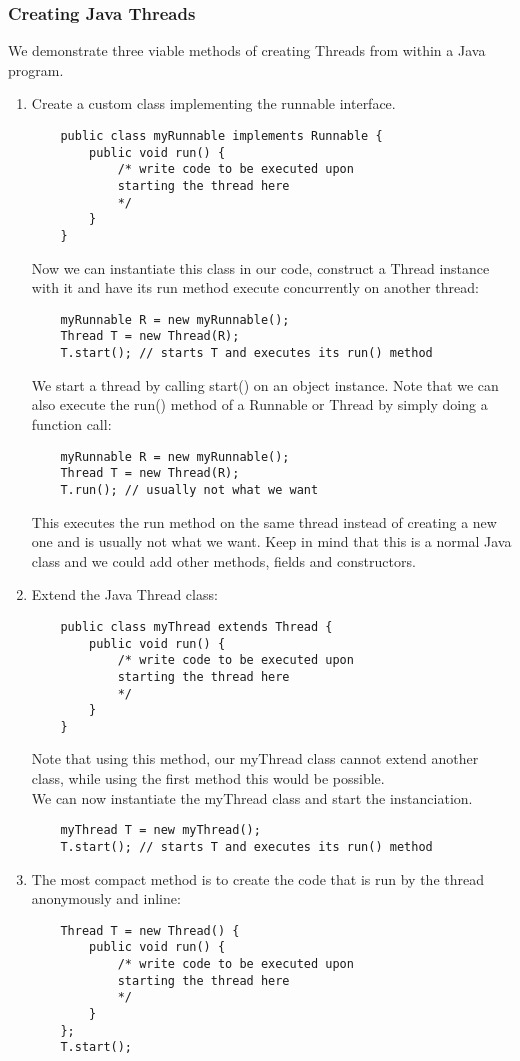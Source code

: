 \documentclass[main]{subfiles}
\begin{document}
\subsubsection{Creating Java Threads}
We demonstrate three viable methods of creating Threads from within a Java program.
\begin{enumerate}
    \item Create a custom class implementing the runnable interface.
    \begin{verbatim}
    public class myRunnable implements Runnable {
        public void run() {
            /* write code to be executed upon
            starting the thread here
            */
        }
    }
    \end{verbatim}
    Now we can instantiate this class in our code, construct a Thread instance with it and have its run method execute concurrently on another thread:
    \begin{verbatim}
    myRunnable R = new myRunnable();
    Thread T = new Thread(R);
    T.start(); // starts T and executes its run() method
    \end{verbatim}
    We start a thread by calling start() on an object instance. Note that we can also execute the run() method of a Runnable or Thread by simply doing a function call:
    \begin{verbatim}
    myRunnable R = new myRunnable();
    Thread T = new Thread(R);
    T.run(); // usually not what we want
    \end{verbatim}
    This executes the run method on the same thread instead of creating a new one and is usually not what we want.
    Keep in mind that this is a normal Java class and we could add other methods, fields and constructors.

    \item Extend the Java Thread class:
    \begin{verbatim}
    public class myThread extends Thread {
        public void run() {
            /* write code to be executed upon
            starting the thread here
            */
        }
    }
    \end{verbatim}
    Note that using this method, our myThread class cannot extend another class, while using the first method this would be possible.\\
    We can now instantiate the myThread class and start the instanciation.
    \begin{verbatim}
    myThread T = new myThread();
    T.start(); // starts T and executes its run() method
    \end{verbatim}

    \item The most compact method is to create the code that is run by the thread anonymously and inline:
    \begin{verbatim}
    Thread T = new Thread() {
        public void run() {
            /* write code to be executed upon
            starting the thread here
            */
        }
    };
    T.start();
    \end{verbatim}
\end{enumerate}
\end{document}
